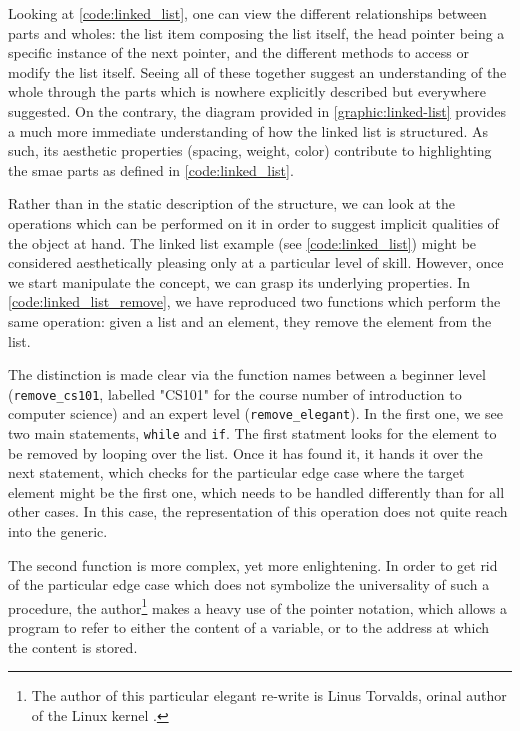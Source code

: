 Looking at \autoref{code:linked_list}, one can view the different relationships between parts and wholes: the list item composing the list itself, the head pointer being a specific instance of the next pointer, and the different methods to access or modify the list itself. Seeing all of these together suggest an understanding of the whole through the parts which is nowhere explicitly described but everywhere suggested. On the contrary, the diagram provided in \autoref{graphic:linked-list} provides a much more immediate understanding of how the linked list is structured. As such, its aesthetic properties (spacing, weight, color) contribute to highlighting the smae parts as defined in \autoref{code:linked_list}.

Rather than in the static description of the structure, we can look at the operations which can be performed on it in order to suggest implicit qualities of the object at hand. The linked list example (see \autoref{code:linked_list}) might be considered aesthetically pleasing only at a particular level of skill. However, once we start manipulate the concept, we can grasp its underlying properties. In \autoref{code:linked_list_remove}, we have reproduced two functions which perform the same operation: given a list and an element, they remove the element from the list.

The distinction is made clear via the function names between a beginner level (\lstinline{remove_cs101}, labelled "CS101" for the course number of introduction to computer science) and an expert level (\lstinline{remove_elegant}). In the first one, we see two main statements, \lstinline{while} and \lstinline{if}. The first statment looks for the element to be removed by looping over the list. Once it has found it, it hands it over the next statement, which checks for the particular edge case where the target element might be the first one, which needs to be handled differently than for all other cases. In this case, the representation of this operation does not quite reach into the generic.

The second function is more complex, yet more enlightening. In order to get rid of the particular edge case which does not symbolize the universality of such a procedure, the author\footnote{The author of this particular elegant re-write is Linus Torvalds, orinal author of the Linux kernel \citep{torvalds_linus_2016}.} makes a heavy use of the pointer notation, which allows a program to refer to either the content of a variable, or to the address at which the content is stored.

